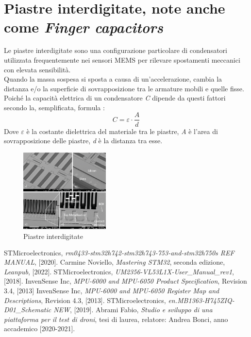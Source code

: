 \documentclass[11pt]{report}
\begin{document}
\section{Piastre interdigitate, note anche come \textit{Finger capacitors}}
Le piastre interdigitate sono una configurazione particolare di condensatori utilizzata frequentemente nei sensori MEMS per rilevare spostamenti meccanici con elevata sensibilità.\\
Quando la massa sospesa si sposta a causa di un'accelerazione, cambia la distanza e/o la superficie di sovrapposizione tra le armature mobili e quelle fisse. Poiché la capacità elettrica di un 
condensatore \textit{C} dipende da questi fattori secondo la, semplificata, formula :\\
\begin{equation}
    C = \varepsilon \cdot \frac{\textit{A}}{\textit{d}}
\end{equation}
Dove $\varepsilon$ è la costante dielettrica del materiale tra le piastre, \textit{A} è l'area di sovrapposizione delle piastre, \textit{d} è la distanza tra esse.\\

\begin{figure}[H]
    \centering
    \includegraphics[width = 0.4\textwidth]{images/IMMAGINE_A_1_piastre_inerdigitate .png}
    \caption{Piastre interdigitate}
    \label{fig:etichetta}
\end{figure}

\begin{thebibliography}{9}
     STMicroelectronics, \emph{rm0433-stm32h742-stm32h743-753-and-stm32h750s REF MANUAL}, [2020].
     Carmine Noviello, \emph{Mastering STM32}, seconda edizione, \emph{Leanpub}, [2022].
     STMicroelectronics, \emph{UM2356-VL53L1X-User\_Manual\_rev1}, [2018].
     InvenSense Inc, \emph{MPU-6000 and MPU-6050 Product Specification}, Revision 3.4, [2013]
     InvenSense Inc, \emph{MPU-6000 and MPU-6050 Register Map and Descriptions}, Revision 4.3, [2013].
     STMicroelectronics, \emph{en.MB1363-H745ZIQ-D01\_Schematic NEW}, [2019].
     Abrami Fabio, \emph{Studio e sviluppo di una piattaforma per il test di droni}, tesi di laurea, relatore: Andrea Bonci, anno accademico [2020-2021].

\end{thebibliography}
\end{document}

